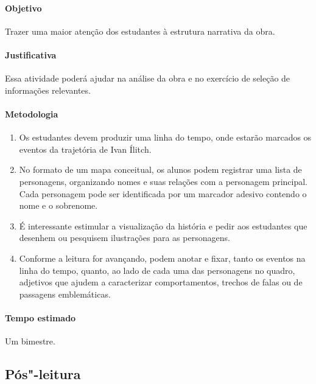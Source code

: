 \documentclass[12pt]{extarticle}
\begin{document}
\paragraph{Objetivo} Trazer uma maior atenção dos estudantes à estrutura
narrativa da obra.

\paragraph{Justificativa} Essa atividade poderá ajudar na análise 
da obra e no exercício de seleção de informações relevantes.

\paragraph{Metodologia}

\begin{enumerate}

\item Os estudantes devem produzir uma linha do
tempo, onde estarão marcados os eventos da trajetória de Ivan Ílitch.

\item No formato de um mapa conceitual, os alunos podem 
registrar uma lista de personagens, organizando nomes e suas
relações com a personagem principal. Cada personagem pode ser
identificada por um marcador adesivo contendo o nome e o sobrenome.

\item É interessante estimular a visualização da história e pedir aos estudantes
que desenhem ou pesquisem ilustrações para as personagens.

\item Conforme a leitura for avançando, podem anotar e fixar, 
tanto os eventos na linha do tempo, quanto, ao lado 
de cada uma das personagens no quadro, adjetivos
que ajudem a caracterizar comportamentos, trechos de falas ou de
passagens emblemáticas.

\end{enumerate}

\paragraph{Tempo estimado} Um bimestre.


\subsection{Pós"-leitura}
\end{document}
